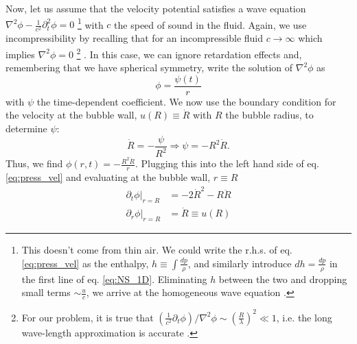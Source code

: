 \documentclass[rmp,aps,nofootinbib,superscriptaddress,floatfix]{revtex4-2}
\begin{document}
Now, let us assume that the velocity potential satisfies a wave equation $\nabla^2 \phi - \frac{1}{c^2}\partial_t^2 \phi =0 $ \footnote{This doesn't come from thin air. We could write the r.h.s. of eq. \ref{eq:press_vel} as the enthalpy, $h\equiv \int \frac{dp}{\rho}$, and similarly introduce $dh=\frac{dp}{\rho}$ in the first line of eq. \ref{eq:NS_1D}. Eliminating $h$ between the two and dropping small terms $\sim \frac{u}{c}$, we arrive at the homogeneous wave equation \cite{leighton2007derivation,brenner2002single,prosperetti1999old}.} with $c$ the speed of sound in the fluid. Again, we use incompressibility by recalling that for an incompressible fluid $c\rightarrow \infty$ which implies $\nabla^2 \phi =0$ \footnote{For our problem, it is true that $\left( \frac{1}{c^2} \partial_t \phi \right) / \nabla^2 \phi \sim \left( \frac{R}{\lambda} \right)^2 \ll 1$, i.e. the long wave-length approximation is accurate \cite{prosperetti1999old,prosperetti1986bubble,leighton2007derivation}.} . In this case, we can ignore retardation effects and, remembering that we have spherical symmetry, write the solution of $\nabla^2 \phi$ as 
\begin{equation}
    \phi = \frac{\psi(t)}{r}
\end{equation}
with $\psi$ the time-dependent coefficient. We now use the boundary condition for the velocity at the bubble wall, $u(R)\equiv \dot{R}$ with $R$ the bubble radius, to determine $\psi$:
\begin{equation}
    \dot{R} = -\frac{\psi}{R^2} \Rightarrow \psi = -R^2 \dot{R}.
\end{equation}  
Thus, we find $\phi(r,t) = -\frac{R^2 \dot{R}}{r}$. Plugging this into the left hand side of eq. \ref{eq:press_vel} and evaluating at the bubble wall, $r\equiv R$
\begin{equation}
\begin{split}
    \partial_t \phi \vert_{r=R} & = -2\dot{R}^2-R\ddot{R} \\
    \partial_r \phi \vert_{r=R} & = \dot{R} \equiv u(R)
\end{split}
\end{equation}
\end{document}
